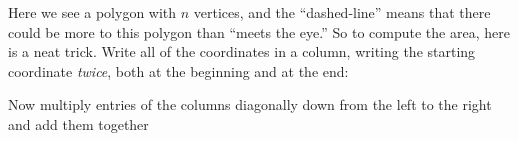 \documentclass{ximera}
\begin{document}
Here we see a polygon with $n$ vertices, and the ``dashed-line''
means that there could be more to this polygon than ``meets the
eye.'' So to compute the area, here is a neat trick. Write all of
the coordinates in a column, writing the starting coordinate
\textit{twice}, both at the beginning and at the end:

\begin{image}[.5in]
\end{image}

Now multiply entries of the columns diagonally down from the left to the right and add them together
\end{document}
